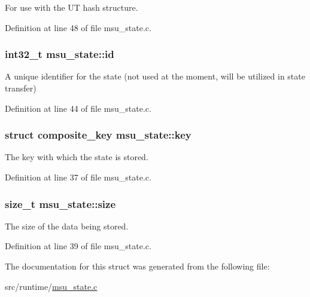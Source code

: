 For use with the U\-T hash structure. 



Definition at line 48 of file msu\-\_\-state.\-c.

\hypertarget{structmsu__state_a9ce5b8e3cf4774a8920c01b02c54c5a1}{
\subsubsection[{id}]{\setlength{\rightskip}{0pt plus 5cm}int32\-\_\-t msu\-\_\-state\-::id}}\label{structmsu__state_a9ce5b8e3cf4774a8920c01b02c54c5a1}


A unique identifier for the state (not used at the moment, will be utilized in state transfer) 



Definition at line 44 of file msu\-\_\-state.\-c.

\hypertarget{structmsu__state_a847e9475d17bba6d22da32d9400be11a}{
\subsubsection[{key}]{\setlength{\rightskip}{0pt plus 5cm}struct {\bf composite\-\_\-key} msu\-\_\-state\-::key}}\label{structmsu__state_a847e9475d17bba6d22da32d9400be11a}


The key with which the state is stored. 



Definition at line 37 of file msu\-\_\-state.\-c.

\hypertarget{structmsu__state_a6fb5d739fe1877967cb59624fa454157}{
\subsubsection[{size}]{\setlength{\rightskip}{0pt plus 5cm}size\-\_\-t msu\-\_\-state\-::size}}\label{structmsu__state_a6fb5d739fe1877967cb59624fa454157}


The size of the data being stored. 



Definition at line 39 of file msu\-\_\-state.\-c.



The documentation for this struct was generated from the following file\-:\begin{DoxyCompactItemize}
\item 
src/runtime/\hyperlink{msu__state_8c}{msu\-\_\-state.\-c}\end{DoxyCompactItemize}
